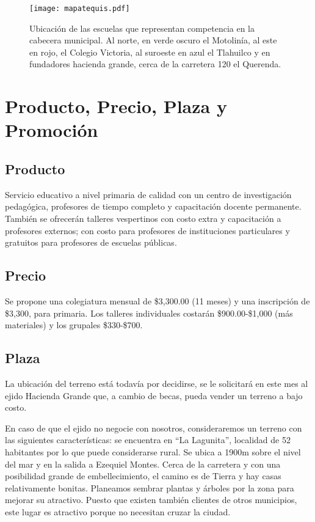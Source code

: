 \documentclass[10pt,letterpaper,oneside]{book}
\begin{document}
\begin{figure}[h]
\centering
\texttt{[image: mapatequis.pdf]}
\caption{Ubicación de las escuelas que representan competencia en la cabecera municipal. Al norte, en verde oscuro el Motolinía, al este en rojo, el Colegio Victoria, al suroeste en azul el Tlahuilco y en fundadores hacienda grande, cerca de la carretera 120 el Querenda.}
\end{figure}

\section{Producto, Precio, Plaza y Promoción}

\subsection{Producto}
Servicio educativo a nivel primaria de calidad con un centro de investigación pedagógica, profesores de tiempo completo y capacitación docente permanente. También se ofrecerán talleres vespertinos con costo extra y capacitación a profesores externos; con costo para profesores de instituciones particulares y gratuitos para profesores de escuelas públicas. 


\subsection{Precio}
Se propone una colegiatura mensual de \$3,300.00 (11 meses) y una inscripción de \$3,300, para primaria. Los talleres individuales costarán \$900.00-\$1,000 (más materiales) y los grupales \$330-\$700. 

\subsection{Plaza}

La ubicación del terreno está todavía por decidirse, se le solicitará en este mes al ejido Hacienda Grande que, a cambio de becas, pueda vender un terreno a bajo costo.

En caso de que el ejido no negocie con nosotros, consideraremos un terreno con las siguientes características: se encuentra en ``La Lagunita'', localidad de 52 habitantes por lo que puede considerarse rural. Se ubica a  1900m sobre el nivel del mar y en la salida a Ezequiel Montes. Cerca de la carretera y con una posibilidad grande de embellecimiento, el camino es de Tierra y hay casas relativamente bonitas. Planeamos sembrar plantas y árboles por la zona para mejorar su atractivo. Puesto que existen también clientes de otros municipios, este lugar es atractivo porque no necesitan cruzar la ciudad.
\end{document}

